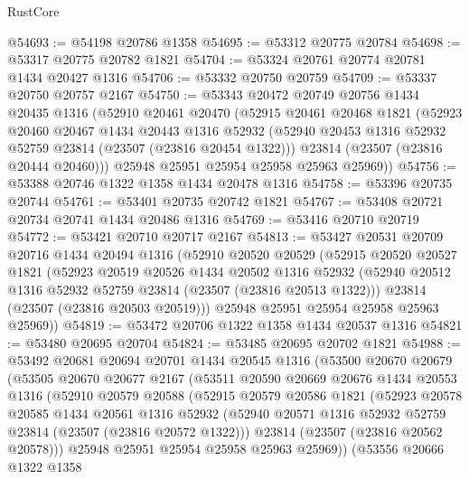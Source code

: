 \begin{lexlean}{RustCore}
\begin{coremodule}
@54693 := @54198 @20786 @1358
@54695 := @53312 @20775 @20784
@54698 := @53317 @20775 @20782 @1821
@54704 := @53324 @20761 @20774 @20781 @1434 @20427 @1316
@54706 := @53332 @20750 @20759
@54709 := @53337 @20750 @20757 @2167
@54750 := @53343
    @20472
    @20749
    @20756
    @1434
    @20435
    @1316
    (@52910
      @20461
      @20470
      (@52915
        @20461
        @20468
        @1821
        (@52923
          @20460
          @20467
          @1434
          @20443
          @1316
          @52932
          (@52940 @20453 @1316 @52932 @52759 @23814 (@23507 (@23816 @20454 @1322)))
          @23814
          (@23507 (@23816 @20444 @20460)))
        @25948
        @25951
        @25954
        @25958
        @25963
        @25969))
@54756 := @53388 @20746 @1322 @1358 @1434 @20478 @1316
@54758 := @53396 @20735 @20744
@54761 := @53401 @20735 @20742 @1821
@54767 := @53408 @20721 @20734 @20741 @1434 @20486 @1316
@54769 := @53416 @20710 @20719
@54772 := @53421 @20710 @20717 @2167
@54813 := @53427
    @20531
    @20709
    @20716
    @1434
    @20494
    @1316
    (@52910
      @20520
      @20529
      (@52915
        @20520
        @20527
        @1821
        (@52923
          @20519
          @20526
          @1434
          @20502
          @1316
          @52932
          (@52940 @20512 @1316 @52932 @52759 @23814 (@23507 (@23816 @20513 @1322)))
          @23814
          (@23507 (@23816 @20503 @20519)))
        @25948
        @25951
        @25954
        @25958
        @25963
        @25969))
@54819 := @53472 @20706 @1322 @1358 @1434 @20537 @1316
@54821 := @53480 @20695 @20704
@54824 := @53485 @20695 @20702 @1821
@54988 := @53492
    @20681
    @20694
    @20701
    @1434
    @20545
    @1316
    (@53500
      @20670
      @20679
      (@53505
        @20670
        @20677
        @2167
        (@53511
          @20590
          @20669
          @20676
          @1434
          @20553
          @1316
          (@52910
            @20579
            @20588
            (@52915
              @20579
              @20586
              @1821
              (@52923
                @20578
                @20585
                @1434
                @20561
                @1316
                @52932
                (@52940 @20571 @1316 @52932 @52759 @23814 (@23507 (@23816 @20572 @1322)))
                @23814
                (@23507 (@23816 @20562 @20578)))
              @25948
              @25951
              @25954
              @25958
              @25963
              @25969))
          (@53556
            @20666
            @1322
            @1358

\end{coremodule}
\end{lexlean}
